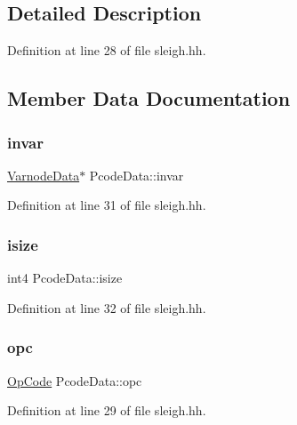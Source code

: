 \subsection{Detailed Description}


Definition at line 28 of file sleigh.\+hh.



\subsection{Member Data Documentation}
\mbox{\label{struct_pcode_data_ab0572b3620e623607f76ad6b580dc589}} 
\subsubsection{\texorpdfstring{invar}{invar}}
{\footnotesize\ttfamily \mbox{\hyperlink{struct_varnode_data}{Varnode\+Data}}$\ast$ Pcode\+Data\+::invar}



Definition at line 31 of file sleigh.\+hh.

\mbox{\label{struct_pcode_data_a32d8b960a624c445680fb478f203a18e}} 
\subsubsection{\texorpdfstring{isize}{isize}}
{\footnotesize\ttfamily int4 Pcode\+Data\+::isize}



Definition at line 32 of file sleigh.\+hh.

\mbox{\label{struct_pcode_data_a79e291dfd074383adc36230588ed193c}} 
\subsubsection{\texorpdfstring{opc}{opc}}
{\footnotesize\ttfamily \mbox{\hyperlink{opcodes_8hh_abeb7dfb0e9e2b3114e240a405d046ea7}{Op\+Code}} Pcode\+Data\+::opc}



Definition at line 29 of file sleigh.\+hh.

